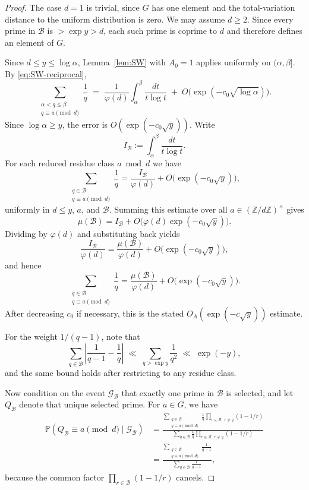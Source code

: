 \documentclass[11pt,reqno]{amsart}
\theoremstyle{plain}
\theoremstyle{definition}
\newcommand{\ZZ}{\mathbb{Z}}
\newcommand{\PP}{\mathbb{P}}
\begin{document}
\begin{proof}
The case $d=1$ is trivial, since $G$ has one element and the total-variation
distance to the uniform distribution is zero. We may assume $d\ge 2$. Since
every prime in $\mathcal B$ is $>\exp y>d$, each such prime is coprime to $d$
and therefore defines an element of $G$.

Since $d\le y\le\log\alpha$, Lemma~\ref{lem:SW} with $A_0=1$ applies
uniformly on $(\alpha,\beta]$. By \eqref{eq:SW-reciprocal},
\[
\sum_{\substack{\alpha<q\le\beta\\q\equiv a\pmod d}}\frac1q
\;=\;
\frac1{\varphi(d)}\int_\alpha^\beta\frac{dt}{t\log t}
\;+\;
O\!\bigl(\exp(-c_0\sqrt{\log\alpha})\bigr).
\]
Since $\log\alpha\ge y$, the error is $O(\exp(-c_0\sqrt y))$. Write
\[
I_{\mathcal B}:=\int_\alpha^\beta\frac{dt}{t\log t}.
\]
For each reduced residue class $a\bmod d$ we have
\[
\sum_{\substack{q\in\mathcal B\\q\equiv a\pmod d}}\frac1q
=
\frac{I_{\mathcal B}}{\varphi(d)}
+
O\!\bigl(\exp(-c_0\sqrt y)\bigr),
\]
uniformly in $d\le y$, $a$, and $\mathcal B$. Summing this estimate over all
$a\in(\ZZ/d\ZZ)^\times$ gives
\[
\mu(\mathcal B)
=
I_{\mathcal B}
+
O\!\bigl(\varphi(d)\exp(-c_0\sqrt y)\bigr).
\]
Dividing by $\varphi(d)$ and substituting back yields
\[
\frac{I_{\mathcal B}}{\varphi(d)}
=
\frac{\mu(\mathcal B)}{\varphi(d)}
+
O\!\bigl(\exp(-c_0\sqrt y)\bigr),
\]
and hence
\[
\sum_{\substack{q\in\mathcal B\\q\equiv a\pmod d}}\frac1q
=
\frac{\mu(\mathcal B)}{\varphi(d)}
+
O\!\bigl(\exp(-c_0\sqrt y)\bigr).
\]
After decreasing $c_0$ if necessary, this is the stated
$O_A(\exp(-c\sqrt y))$ estimate.

For the weight $1/(q-1)$, note that
\[
\sum_{q\in\mathcal{B}}\left|\frac1{q-1}-\frac1q\right|
\;\ll\;
\sum_{q>\exp y}\frac1{q^2}
\;\ll\;
\exp(-y),
\]
and the same bound holds after restricting to any residue class.

Now condition on the event $\mathcal G_{\mathcal B}$ that exactly one prime in
$\mathcal B$ is selected, and let $Q_{\mathcal B}$ denote that unique selected
prime. For $a\in G$, we have
\begin{align*}
\PP(Q_{\mathcal B}\equiv a\pmod d\mid \mathcal G_{\mathcal B})
&=
\frac{
\sum_{\substack{q\in\mathcal{B}\\q\equiv a\pmod d}}
\frac1q\prod_{r\in\mathcal{B},\ r\ne q}(1-1/r)
}{
\sum_{q\in\mathcal{B}}
\frac1q\prod_{r\in\mathcal{B},\ r\ne q}(1-1/r)
}  \\
&=
\frac{
\sum_{\substack{q\in\mathcal{B}\\q\equiv a\pmod d}}\frac1{q-1}
}{
\sum_{q\in\mathcal{B}}\frac1{q-1}
},
\end{align*}
because the common factor $\prod_{r\in\mathcal B}(1-1/r)$ cancels.


\end{proof}
\end{document}
